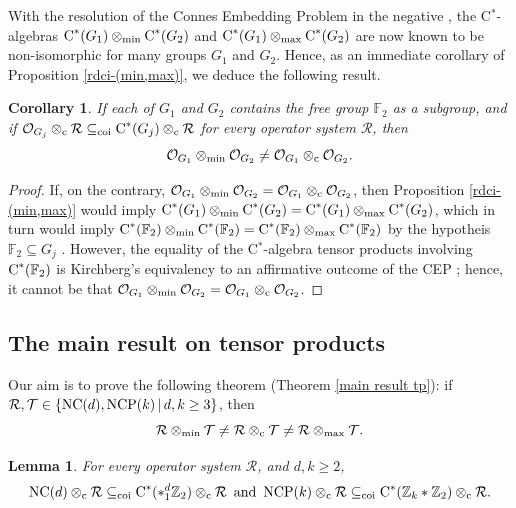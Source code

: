 \documentclass{amsart}
\newtheorem{lemma}[theorem]{Lemma}
\newtheorem{corollary}[theorem]{Corollary}
\theoremstyle{definition}
\theoremstyle{remark}
\newcommand\ftwo{{\mathbb F}_2}
\newcommand\osr{{\mathcal R}}
\newcommand\ost{{\mathcal T}}
\newcommand\omin{\otimes_{\textrm{min}}}
\newcommand\omax{\otimes_{\textrm{max}}}
\newcommand\oc{\otimes_{\textrm c}}
\newcommand\cstar{{\textrm C}^*}                              %
\numberwithin{equation}{section}
\begin{document}
With the resolution of the Connes Embedding Problem in the negative \cite{goldbring2022,nonCEP}, the C$^*$-algebras 
$\cstar(G_1)\otimes_{\textrm{min}}\cstar(G_2)$ and $\cstar(G_1)\otimes_{\textrm{max}}\cstar(G_2)$ are now known to be non-isomorphic for
many groups $G_1$ and $G_2$. Hence, as 
an immediate corollary of Proposition \ref{rdci-(min,max)}, we deduce the following result.

\begin{corollary}\label{main_corollary_tensor}
	If each of $G_1$ and $G_2$ contains the free group $\ftwo$ as a subgroup, and if $\mathcal O_{G_j}\otimes_{\textrm c}\mathcal R\subseteq_{\textrm{coi}}\cstar(G_j)\otimes_{\textrm c}\mathcal R$ for every operator system $\mathcal R$, then 
\[
\mathcal O_{G_1}\otimes_{\textrm{min}}\mathcal O_{G_2}\neq \mathcal O_{G_1}\otimes_{\textrm c}\mathcal O_{G_2}.
\]
\end{corollary}
\begin{proof}
	If, on the contrary, $\mathcal O_{G_1}\otimes_{\textrm{min}}\mathcal O_{G_2}= \mathcal O_{G_1}\otimes_{\textrm c}\mathcal O_{G_2}$, then Proposition \ref{rdci-(min,max)} 
	would imply $\cstar(G_1)\otimes_{\textrm{min}}\cstar(G_2)=\cstar(G_1)\otimes_{\textrm{max}}\cstar(G_2)$, which in turn would imply
	$\cstar(\ftwo)\omin\cstar(\ftwo)=\cstar(\ftwo)\omax\cstar(\ftwo)$ by the hypotheis $\mathbb F_2\subseteq G_j$
	\cite[Proposition 3.3]{farenick--kavruk--paulsen--todorov2018}. However, the equality of the C$^*$-algebra tensor products involving $\cstar(\ftwo)$
	is Kirchberg's equivalency to an affirmative outcome of the CEP \cite{kirchberg1993}; hence, it cannot be that 
	$\mathcal O_{G_1}\otimes_{\textrm{min}}\mathcal O_{G_2}= \mathcal O_{G_1}\otimes_{\textrm c}\mathcal O_{G_2}$.
\end{proof}

\subsection{The main result on tensor products}
Our aim is to prove the following theorem (Theorem \ref{main result tp}):
if $\osr,\ost\in\{\mbox{\textrm{NC}}(d),\mbox{\textrm{NCP}}(k)\,|\,d,k\geq3\}$, then
 \[
 \osr\omin\ost \not= \osr\oc\ost \not = \osr\omax\ost.
 \]

\begin{lemma}\label{rdci_prism}
	For every operator system $\mathcal R$, and $d,k\geq 2$,
\[
\mbox{\textrm{NC}}(d)\otimes_{\textrm c}\mathcal R\subseteq_{\textrm{coi}}\cstar(*_1^d \mathbb Z_2)\otimes_{\textrm c}\mathcal R
\,\mbox{ and }\,
\mbox{\textrm{NCP}}(k)\otimes_{\textrm c}\mathcal R\subseteq_{\textrm{coi}}\cstar(\mathbb Z_k\ast \mathbb Z_2)\otimes_{\textrm c}\mathcal R.
\] 
\end{lemma}
\end{document}
